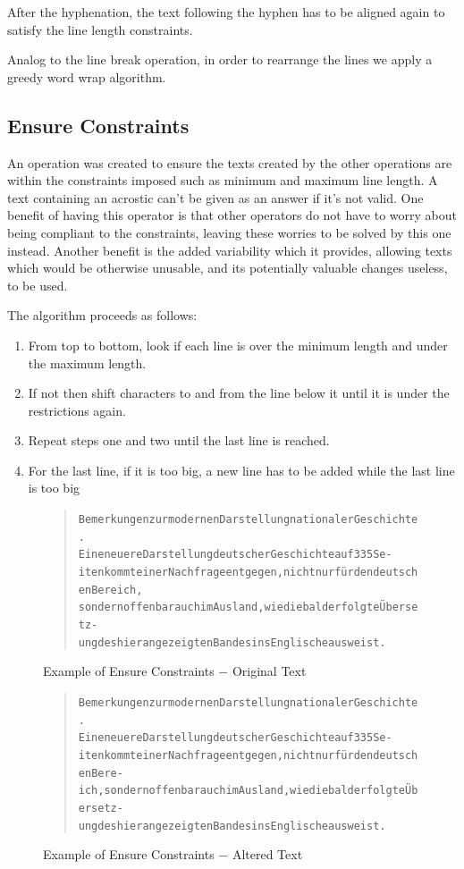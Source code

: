 \documentclass[11pt]{reportAlternative}
\begin{document}
After the hyphenation, the text following the hyphen has to be aligned again to satisfy the line length constraints.

Analog to the line break operation, in order to rearrange the lines we apply a greedy word wrap algorithm.

\subsection{Ensure Constraints}
An operation was created to ensure the texts created by the other operations are within the constraints imposed such as minimum and maximum line length. A text containing an acrostic can't be given as an answer if it's not valid. One benefit of having this operator is that other operators do not have to worry about being compliant to the constraints, leaving these worries to be solved by this one instead. Another benefit is the added variability which it provides, allowing texts which would be otherwise unusable, and its potentially valuable changes useless, to be used.

The algorithm proceeds as follows:
\begin{enumerate}
\item From top to bottom, look if each line is over the minimum length and under the maximum length.
\item If not then shift characters to and from the line below it until it is under the restrictions again.
\item Repeat steps one and two until the last line is reached.
\item For the last line, if it is too big, a new line has to be added while the last line is too big
\end{enumerate}

\begin{figure}[H]
	\begin{quote}
		\begin{alltt}
Bemerkungen zur modernen Darstellung nationaler Geschichte.
Eine neuere Darstellung deutscher Geschichte auf 335 Se-
iten kommt einer Nachfrage entgegen, nicht nur für den deutschen Bereich,
sondern offenbar auch im Ausland, wie die bald erfolgte Übersetz-
ung des hier angezeigten Bandes ins Englische ausweist.
		\end{alltt}
	\end{quote}
	\caption{Example of Ensure Constraints $-$ Original Text}
\end{figure}

\begin{figure}[H]
	\begin{quote}
		\begin{alltt}
			Bemerkungen zur modernen Darstellung nationaler Geschichte.
			Eine neuere Darstellung deutscher Geschichte auf 335 Se-
			iten kommt einer Nachfrage entgegen, nicht nur für den deutschen Bere-
			ich, sondern offenbar auch im Ausland, wie die bald erfolgte Übersetz-
			ung des hier angezeigten Bandes ins Englische ausweist.
		\end{alltt}
	\end{quote}
	\caption{Example of Ensure Constraints $-$ Altered Text}
\end{figure}
\end{document}
